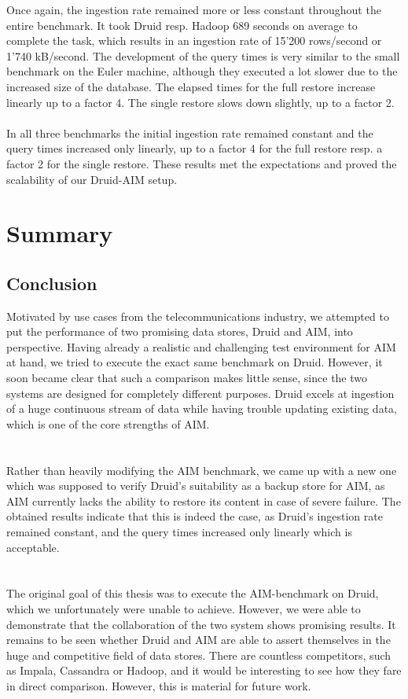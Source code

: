 \documentclass[11pt,singlecolumn]{scrartcl}
\begin{document}
Once again, the ingestion rate remained more or less constant throughout the entire benchmark. It took Druid resp. Hadoop 689 seconds on average to complete the task, which results in an ingestion rate of 15'200 rows/second or 1'740 kB/second. The development of the query times is very similar to the small benchmark on the Euler machine, although they executed a lot slower due to the increased size of the database. The elapsed times for the full restore increase linearly up to a factor 4. The single restore slows down slightly, up to a factor 2. \\\\
In all three benchmarks the initial ingestion rate remained constant and the query times increased only linearly, up to a factor 4 for the full restore resp. a factor 2 for the single restore. These results met the expectations and proved the scalability of our Druid-AIM setup. 

\clearpage
\section{Summary}
\subsection{Conclusion}
Motivated by use cases from the telecommunications industry, we attempted to put the performance of two promising data stores, Druid and AIM, into perspective. Having already a realistic and challenging test environment for AIM at hand, we tried to execute the exact same benchmark on Druid. However, it soon became clear that such a comparison makes little sense, since the two systems are designed for completely different purposes. Druid excels at ingestion of a huge continuous stream of data while having trouble updating existing data, which is one of the core strengths of AIM.\\\\\\
Rather than heavily modifying the AIM benchmark, we came up with a new one which was supposed to verify Druid's suitability as a backup store for AIM, as AIM currently lacks the ability to restore its content in case of severe failure. The obtained results indicate that this is indeed the case, as Druid's ingestion rate remained constant, and the query times increased only linearly which is acceptable.\\\\\\
The original goal of this thesis was to execute the AIM-benchmark on Druid, which we unfortunately were unable to achieve. However, we were able to demonstrate that the collaboration of the two system shows promising results. It remains to be seen whether Druid and AIM are able to assert themselves in the huge and competitive field of data stores. There are countless competitors, such as Impala, Cassandra or Hadoop, and it would be interesting to see how they fare in direct comparison. However, this is material for future work.
\end{document}
